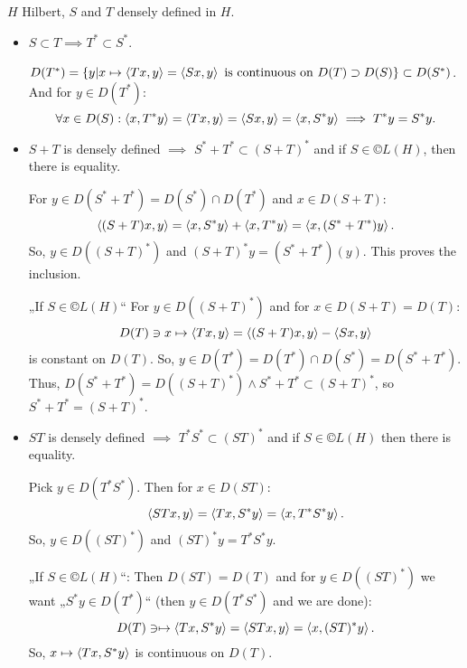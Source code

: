 \documentclass[12pt]{article}					%
\begin{document}
\begin{tvrzeni}
	$H$ Hilbert, $S$ and $T$ densely defined in $H$.

	\begin{itemize}
		\item $S \subset T \implies T^* \subset S^*$.

			\begin{dukazin}
				$D(T^*) = \{y | x \mapsto\left\langle Tx, y\right\rangle = \left\langle Sx, y\right\rangle \text{ is continuous on } D(T) \supset D(S)\} \subset D(S^*)$. And for $y \in D(T^*)$:
				$$ \forall x \in D(S): \left\langle x, T^* y\right\rangle = \left\langle Tx, y\right\rangle = \left\langle Sx, y\right\rangle = \left\langle x, S^* y\right\rangle \implies T^* y = S^* y. $$
			\end{dukazin}
		\item $S+T$ is densely defined $\implies$ $S^* + T^* \subset (S + T)^*$ and if $S \in ©L(H)$, then there is equality.

			\begin{dukazin}
				For $y \in D(S^* + T^*) = D(S^*) \cap D(T^*)$ and $x \in D(S + T)$:
				$$ \left\langle(S + T) x, y\right\rangle = \left\langle x, S^* y\right\rangle + \left\langle x, T^* y\right\rangle = \left\langle x, (S^* + T^*) y\right\rangle. $$
				So, $y \in D((S + T)^*)$ and $(S+T)^* y = (S^* + T^*)(y)$. This proves the inclusion.

				„If $S \in ©L(H)$“ For $y \in D((S + T)^*)$ and for $x \in D(S + T) = D(T)$:
				$$ D(T) \ni x \mapsto \left\langle Tx, y\right\rangle = \left\langle(S + T)x, y\right\rangle - \left\langle S x, y\right\rangle $$
				is constant on $D(T)$. So, $y \in D(T^*) = D(T^*) \cap D(S^*) = D(S^* + T^*)$. Thus, $D(S^* + T^*) = D((S + T)^*) \land S^* + T^* \subset (S + T)^*$, so $S^* + T^* = (S+T)^*$.
			\end{dukazin}

		\item $ST$ is densely defined $\implies$ $T^* S^* \subset (ST)^*$ and if $S \in ©L(H)$ then there is equality.

			\begin{dukazin}
				Pick $y \in D(T^* S^*)$. Then for $x \in D(ST)$:
				$$ \left\langle STx, y\right\rangle = \left\langle T x, S^* y\right\rangle = \left\langle x, T^*S^* y\right\rangle. $$
				So, $y \in D((ST)^*)$ and $(ST)^* y = T^*S^* y$.

				„If $S \in ©L(H)$“: Then $D(ST) = D(T)$ and for $y \in D((ST)^*)$ we want „$S^*y \in D(T^*)$“ (then $y \in D(T^*S^*)$  and we are done):
				$$ D(T) \ni \mapsto \left\langle Tx, S^* y\right\rangle = \left\langle S T x, y\right\rangle = \left\langle x, (ST)^* y\right\rangle. $$
				So, $x \mapsto \left\langle Tx, S^* y\right\rangle$ is continuous on $D(T)$.
			\end{dukazin}
	\end{itemize}
\end{tvrzeni}
\end{document}
